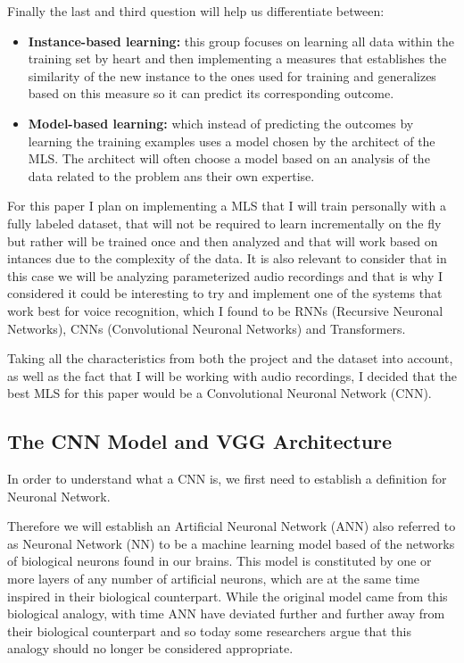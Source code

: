 \documentclass[12pt, a4paper]{article}
\begin{document}
	
	Finally the last and third question will help us differentiate between:
	
	\begin{itemize}
		
	\item \textbf{Instance-based learning:} this group focuses on learning all data within the training set by heart and then implementing a measures that establishes the similarity of the new instance to the ones used for training and generalizes based on this measure so it can predict its corresponding outcome.
	
	\item \textbf{Model-based learning:} which instead of predicting the outcomes by learning the training examples uses a model chosen by the architect of the MLS. The architect will often choose a model based on an analysis of the data related to the problem ans their own expertise.
		
	\end{itemize}

	For this paper I plan on implementing a MLS that I will train personally with a fully labeled dataset, that will not be required to learn incrementally on the fly but rather will be trained once and then analyzed and that will work based on intances due to the complexity of the data. It is also relevant to consider that in this case we will be analyzing parameterized audio recordings and that is why I considered it could be interesting to try and implement one of the systems that work best for voice recognition, which I found to be RNNs (Recursive Neuronal Networks), CNNs (Convolutional Neuronal Networks) and Transformers.
	
	Taking all the characteristics from both the project and the dataset into account, as well as the fact that I will be working with audio recordings, I decided that the best MLS for this paper would be a Convolutional Neuronal Network (CNN).
	
	\clearpage
	
	\subsection{The CNN Model and VGG Architecture}
	
	In order to understand what a CNN is, we first need to establish a definition for Neuronal Network. 
	
	Therefore we will establish an Artificial Neuronal Network (ANN) also referred to as Neuronal Network (NN) to be a machine learning model based of the networks of biological neurons found in our brains. This model is constituted by one or more layers of any number of artificial neurons, which are at the same time inspired in their biological counterpart. While the original model came from this biological analogy, with time ANN have deviated further and further away from their biological counterpart and so today some researchers argue that this analogy should no longer be considered appropriate.
	
\end{document}
